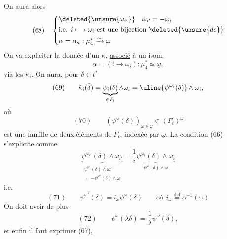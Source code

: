 On aura alors
\[
(68)\quad\left\{\begin{aligned}
&\deleted{\unsure{\omega_{i'}}}\quad\omega_{i'}=-\omega_i\\
&\text{i.e. }i\longmapsto\omega_i\text{ est une bijection }\deleted{\unsure{de}}\\
&\alpha=\alpha_\kappa:\mu_4^*\xrightarrow{\sim}\underline\omega
\end{aligned}\right.
\]
On va expliciter la donnée d'un $\kappa$,
\uline{associé} à un isom.
\[
\alpha=(i\longrightarrow\omega_i):\mu_4^*\simeq\underline\omega,
\]
\deleted{\unsure{$\alpha$}}
via les $\check\kappa_i$. On aura, pour $\delta\in\underline t^*$
\[
(69)\qquad\check\kappa_i(\check\delta)
=\underbrace{\psi_i(\delta)}_{\in F_t}\wedge\omega_i
=\uline{\psi^{\omega_i}(\delta)}\wedge\omega_i,
\]
où
\[
(70)\qquad(\psi^\omega(\delta))_{\omega\in\underline\omega}\in(F_t)^{\underline\omega}
\]
est une famille de  deux éléments de $F_t$,
indexée par $\underline\omega$. La condition (66)
s'explicite comme
\[
\underbrace{\psi^{\omega_{i'}}(\delta)\wedge\omega_{i'}}_{
\substack{\psi^{\omega'}(\delta)\wedge\omega'\\=-\psi^{\omega'}(\delta)\wedge\omega}}
=\frac1i\underbrace{\psi^{\omega_i}(\delta)\wedge\omega_i}_{\psi^\omega(\delta)\wedge\omega}
\]
i.e.
\[
(71)\qquad\psi^{\omega'}(\delta)=i_\omega\psi^\omega(\delta)
\qquad\text{où }i_\omega\overset{\mathrm{def}}=\alpha^{-1}(\omega)
\]
On doit avoir de plus
\[
(72)\qquad\psi^\omega(\lambda\delta)=\frac1\lambda\psi^\omega(\delta),
\]
 et enfin il faut exprimer (67),
